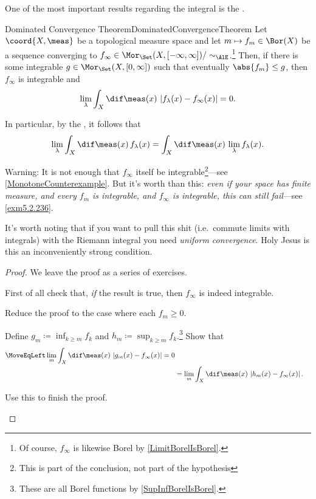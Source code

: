 One of the most important results regarding the integral is the .
\begin{thm}{Dominated Convergence Theorem}{DominatedConvergenceTheorem}
Let $\coord{X,\meas}$ be a topological measure space and let $m\mapsto f_m\in \Bor (X)$ be a sequence converging to $f_\infty \in \Mor _{\Set}(X,[-\infty ,\infty ])/\sim _{\AlE}$.\footnote{Of course, $f_{\infty}$ is likewise Borel by \cref{LimitBorelIsBorel}.}  Then, if there is some integrable $g\in \Mor _{\Set}(X,[0,\infty ])$ such that eventually $\abs{f_m}\leq g$, then $f_\infty$ is integrable and
\begin{equation}
\lim _\lambda \int _X\dif \meas (x)\, \left| f_\lambda (x)-f_\infty (x)\right| =0.
\end{equation}
\begin{rmk}
In particular, by the , it follows that
\begin{equation}
\lim _\lambda \int _X\dif \meas (x)\, f_\lambda (x)=\int _X\dif \meas (x)\, \lim _\lambda f_\lambda (x).
\end{equation}
\end{rmk}
\begin{wrn}
Warning:  It is not enough that $f_\infty$ itself be integrable\footnote{This is part of the conclusion, not part of the hypothesis}---see \cref{MonotoneCounterexample}.  But it's worth than this:  \emph{even if your space has finite measure, and every $f_m$ is integrable, and $f_\infty$ is integrable, this can still fail}---see \cref{exm5.2.236}.
\end{wrn}
\begin{rmk}
It's worth noting that if you want to pull this shit (i.e.\ commute limits with integrals) with the Riemann integral you need \emph{uniform convergence}.  Holy Jesus is this an inconveniently strong condition.
\end{rmk}
\begin{proof}
We leave the proof as a series of exercises.
\begin{exr}{}{}
First of all check that, \emph{if} the result is true, then $f_\infty$ is indeed integrable.
\end{exr}
\begin{exr}{}{}
Reduce the proof to the case where each $f_m\geq 0$.
\end{exr}
\begin{exr}[breakable=false]{}{}
Define $g_m\coloneqq \inf _{k\geq m}f_k$ and $h_m\coloneqq \sup _{k\geq m}f_k$.\footnote{These are all Borel functions by \cref{SupInfBorelIsBorel}.}  Show that
\begin{equation}
\begin{split}
\MoveEqLeft
\lim _m\int _X\dif \meas (x)\, \left| g_m(x)-f_\infty (x)\right| =0 \\
& =\lim _m\int _X\dif \meas (x)\, \left| h_m(x)-f_\infty (x)\right| .
\end{split}
\end{equation}
\end{exr}
\begin{exr}{}{}
Use this to finish the proof.
\end{exr}
\end{proof}
\end{thm}


